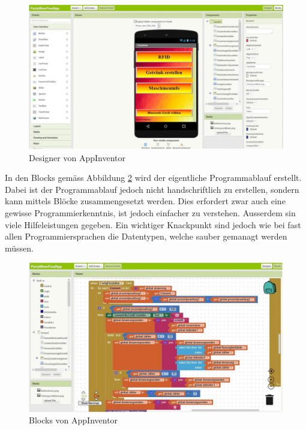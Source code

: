 \newpage

\begin{figure}[h!]
	\centering
	\includegraphics[width=\textwidth]{graphics/AppInventorDesigner}
	\caption{Designer von AppInventor}
	\label{fig:AppInventorDesigner}
\end{figure}

In den Blocks gemäss Abbildung \ref{fig:AppInventorBlocks} wird der eigentliche Programmablauf erstellt. Dabei ist der Programmablauf jedoch nicht handschriftlich zu erstellen, sondern kann mittels Blöcke zusammengesetzt werden. Dies erfordert zwar auch eine gewisse Programmierkenntnis, ist jedoch einfacher zu verstehen. Ausserdem sin viele Hilfeleistungen gegeben. Ein wichtiger Knackpunkt sind jedoch wie bei fast allen Programmiersprachen die Datentypen, welche sauber gemanagt werden müssen.

\begin{figure}[h!]
	\centering
	\includegraphics[width=\textwidth]{graphics/AppInventorBlocks}
	\caption{Blocks von AppInventor}
	\label{fig:AppInventorBlocks}
\end{figure}



 
